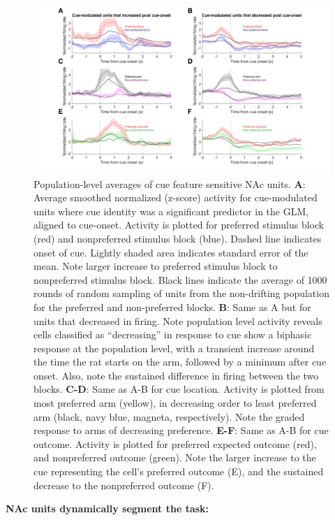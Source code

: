 \documentclass[11pt]{article}
\newcommand{\bsf}[1]{\textbf{#1}}
\begin{document}
{\begin{figure}[h]
\centering
\includegraphics[width=\textwidth]{Fig 7 - Population averages.png}
\caption{Population-level averages of cue feature sensitive NAc units. \bsf{A}:
  Average smoothed normalized (z-score) activity for cue-modulated units where
  cue identity was a significant predictor in the GLM, aligned to
  cue-onset. Activity is plotted for preferred stimulus block (red) and
  nonpreferred stimulus block (blue). Dashed line indicates onset of
  cue. Lightly shaded area indicates standard error of the mean. Note larger
  increase to preferred stimulus block to nonpreferred stimulus block. Black
  lines indicate the average of 1000 rounds of random sampling of units from the
  non-drifting population for the preferred and non-preferred blocks. \bsf{B}:
  Same as A but for units that decreased in firing. Note population level
  activity reveals cells classified as “decreasing” in response to cue show a
  biphasic response at the population level, with a transient increase around
  the time the rat starts on the arm, followed by a minimum after cue
  onset. Also, note the sustained difference in firing between the two
  blocks. \bsf{C-D}: Same as A-B for cue location. Activity is plotted from most
  preferred arm (yellow), in decreasing order to least preferred arm (black,
  navy blue, magneta, respectively). Note the graded response to arms of
  decreasing preference. \bsf{E-F}: Same as A-B for cue outcome. Activity is
  plotted for preferred expected outcome (red), and nonpreferred outcome
  (green). Note the larger increase to the cue representing the cell’s preferred
  outcome (E), and the sustained decrease to the nonpreferred outcome (F).}
\label{fig:pop}
\end{figure}

{\bf NAc units dynamically segment the task:}

}
\end{document}
